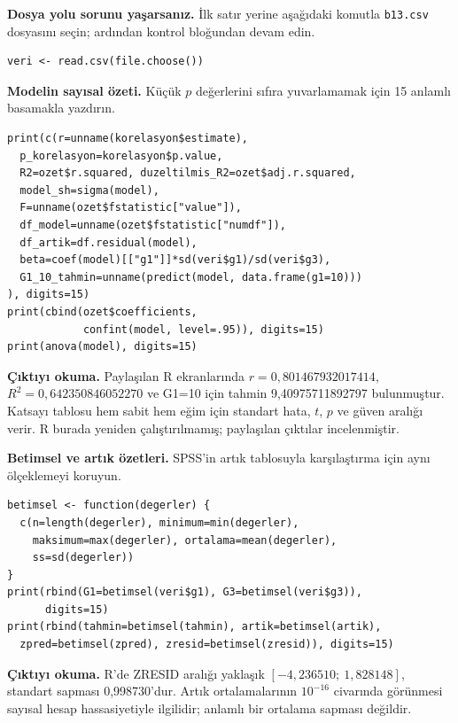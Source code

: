 \textbf{Dosya yolu sorunu yaşarsanız.} İlk satır yerine aşağıdaki
komutla \texttt{b13.csv} dosyasını seçin; ardından kontrol bloğundan
devam edin.
\begin{lstlisting}[style=prismR]
veri <- read.csv(file.choose())
\end{lstlisting}

\par\noindent\begin{minipage}{\linewidth}
\textbf{Modelin sayısal özeti.} Küçük $p$ değerlerini sıfıra
yuvarlamamak için 15 anlamlı basamakla yazdırın.

\begin{lstlisting}[style=prismR]
print(c(r=unname(korelasyon$estimate),
  p_korelasyon=korelasyon$p.value,
  R2=ozet$r.squared, duzeltilmis_R2=ozet$adj.r.squared,
  model_sh=sigma(model),
  F=unname(ozet$fstatistic["value"]),
  df_model=unname(ozet$fstatistic["numdf"]),
  df_artik=df.residual(model),
  beta=coef(model)[["g1"]]*sd(veri$g1)/sd(veri$g3),
  G1_10_tahmin=unname(predict(model, data.frame(g1=10)))
), digits=15)
print(cbind(ozet$coefficients,
            confint(model, level=.95)), digits=15)
print(anova(model), digits=15)
\end{lstlisting}

\textbf{Çıktıyı okuma.} Paylaşılan R ekranlarında
$r=0{,}801467932017414$, $R^2=0{,}642350846052270$ ve
G1=10 için tahmin 9,40975711892797 bulunmuştur. Katsayı tablosu
hem sabit hem eğim için standart hata, $t$, $p$ ve güven aralığı
verir. R burada yeniden çalıştırılmamış; paylaşılan çıktılar incelenmiştir.
\end{minipage}\par

\par\noindent\begin{minipage}{\linewidth}
\textbf{Betimsel ve artık özetleri.} SPSS'in artık tablosuyla
karşılaştırma için aynı ölçeklemeyi koruyun.

\begin{lstlisting}[style=prismR]
betimsel <- function(degerler) {
  c(n=length(degerler), minimum=min(degerler),
    maksimum=max(degerler), ortalama=mean(degerler),
    ss=sd(degerler))
}
print(rbind(G1=betimsel(veri$g1), G3=betimsel(veri$g3)),
      digits=15)
print(rbind(tahmin=betimsel(tahmin), artik=betimsel(artik),
  zpred=betimsel(zpred), zresid=betimsel(zresid)), digits=15)
\end{lstlisting}

\textbf{Çıktıyı okuma.} R'de ZRESID aralığı yaklaşık
$[-4{,}236510;\ 1{,}828148]$, standart sapması 0,998730'dur.
Artık ortalamalarının $10^{-16}$ civarında görünmesi sayısal
hesap hassasiyetiyle ilgilidir; anlamlı bir ortalama sapması değildir.
\end{minipage}\par


